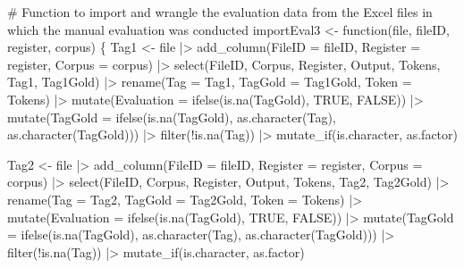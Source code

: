 \documentclass[
  letterpaper,
  DIV=11,
  numbers=noendperiod]{scrreprt}
\newenvironment{Shaded}{\begin{snugshade}}{\end{snugshade}}
\newcommand{\AttributeTok}[1]{\textcolor[rgb]{0.40,0.45,0.13}{#1}}
\newcommand{\CommentTok}[1]{\textcolor[rgb]{0.37,0.37,0.37}{#1}}
\newcommand{\ConstantTok}[1]{\textcolor[rgb]{0.56,0.35,0.01}{#1}}
\newcommand{\ControlFlowTok}[1]{\textcolor[rgb]{0.00,0.23,0.31}{#1}}
\newcommand{\FunctionTok}[1]{\textcolor[rgb]{0.28,0.35,0.67}{#1}}
\newcommand{\NormalTok}[1]{\textcolor[rgb]{0.00,0.23,0.31}{#1}}
\newcommand{\OtherTok}[1]{\textcolor[rgb]{0.00,0.23,0.31}{#1}}
\newcommand{\SpecialCharTok}[1]{\textcolor[rgb]{0.37,0.37,0.37}{#1}}
\begin{document}
\begin{Shaded}
\begin{Highlighting}[]
\CommentTok{\# Function to import and wrangle the evaluation data from the Excel files in which the manual evaluation was conducted}
\NormalTok{importEval3 }\OtherTok{\textless{}{-}} \ControlFlowTok{function}\NormalTok{(file, fileID, register, corpus) \{}
\NormalTok{  Tag1 }\OtherTok{\textless{}{-}}\NormalTok{ file }\SpecialCharTok{|\textgreater{}} 
  \FunctionTok{add\_column}\NormalTok{(}\AttributeTok{FileID =}\NormalTok{ fileID, }\AttributeTok{Register =}\NormalTok{ register, }\AttributeTok{Corpus =}\NormalTok{ corpus) }\SpecialCharTok{|\textgreater{}}
  \FunctionTok{select}\NormalTok{(FileID, Corpus, Register, Output, Tokens, Tag1, Tag1Gold) }\SpecialCharTok{|\textgreater{}} 
  \FunctionTok{rename}\NormalTok{(}\AttributeTok{Tag =}\NormalTok{ Tag1, }\AttributeTok{TagGold =}\NormalTok{ Tag1Gold, }\AttributeTok{Token =}\NormalTok{ Tokens) }\SpecialCharTok{|\textgreater{}} 
  \FunctionTok{mutate}\NormalTok{(}\AttributeTok{Evaluation =} \FunctionTok{ifelse}\NormalTok{(}\FunctionTok{is.na}\NormalTok{(TagGold), }\ConstantTok{TRUE}\NormalTok{, }\ConstantTok{FALSE}\NormalTok{)) }\SpecialCharTok{|\textgreater{}} 
  \FunctionTok{mutate}\NormalTok{(}\AttributeTok{TagGold =} \FunctionTok{ifelse}\NormalTok{(}\FunctionTok{is.na}\NormalTok{(TagGold), }\FunctionTok{as.character}\NormalTok{(Tag), }\FunctionTok{as.character}\NormalTok{(TagGold))) }\SpecialCharTok{|\textgreater{}}
  \FunctionTok{filter}\NormalTok{(}\SpecialCharTok{!}\FunctionTok{is.na}\NormalTok{(Tag)) }\SpecialCharTok{|\textgreater{}} 
  \FunctionTok{mutate\_if}\NormalTok{(is.character, as.factor)}
  
\NormalTok{  Tag2 }\OtherTok{\textless{}{-}}\NormalTok{ file }\SpecialCharTok{|\textgreater{}} 
  \FunctionTok{add\_column}\NormalTok{(}\AttributeTok{FileID =}\NormalTok{ fileID, }\AttributeTok{Register =}\NormalTok{ register, }\AttributeTok{Corpus =}\NormalTok{ corpus) }\SpecialCharTok{|\textgreater{}}
  \FunctionTok{select}\NormalTok{(FileID, Corpus, Register, Output, Tokens, Tag2, Tag2Gold) }\SpecialCharTok{|\textgreater{}} 
  \FunctionTok{rename}\NormalTok{(}\AttributeTok{Tag =}\NormalTok{ Tag2, }\AttributeTok{TagGold =}\NormalTok{ Tag2Gold, }\AttributeTok{Token =}\NormalTok{ Tokens) }\SpecialCharTok{|\textgreater{}} 
  \FunctionTok{mutate}\NormalTok{(}\AttributeTok{Evaluation =} \FunctionTok{ifelse}\NormalTok{(}\FunctionTok{is.na}\NormalTok{(TagGold), }\ConstantTok{TRUE}\NormalTok{, }\ConstantTok{FALSE}\NormalTok{)) }\SpecialCharTok{|\textgreater{}} 
  \FunctionTok{mutate}\NormalTok{(}\AttributeTok{TagGold =} \FunctionTok{ifelse}\NormalTok{(}\FunctionTok{is.na}\NormalTok{(TagGold), }\FunctionTok{as.character}\NormalTok{(Tag), }\FunctionTok{as.character}\NormalTok{(TagGold))) }\SpecialCharTok{|\textgreater{}}
  \FunctionTok{filter}\NormalTok{(}\SpecialCharTok{!}\FunctionTok{is.na}\NormalTok{(Tag)) }\SpecialCharTok{|\textgreater{}} 
  \FunctionTok{mutate\_if}\NormalTok{(is.character, as.factor)}


\end{Highlighting}
\end{Shaded}
\end{document}
